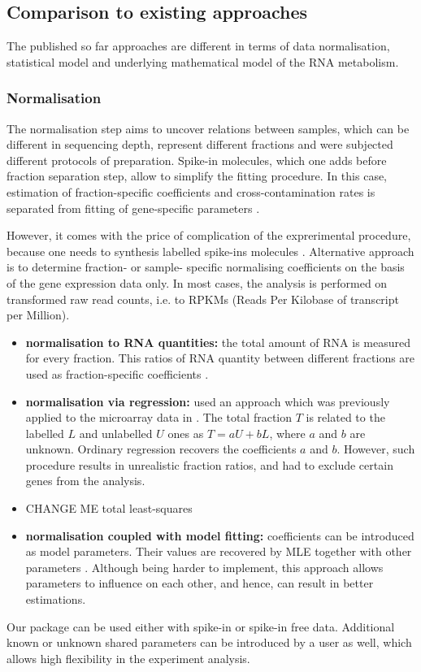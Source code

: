 \subsection{Comparison to existing approaches}
The published so far approaches are different in terms of 
data normalisation, statistical model and underlying mathematical model of the 
RNA metabolism.
\subsubsection*{Normalisation}
The normalisation step aims to uncover relations between samples, which can 
be different in sequencing depth, represent different fractions and were subjected
different protocols of preparation. 
Spike-in molecules, which one adds before fraction separation step,
allow to simplify the fitting procedure. In this case, estimation of fraction-specific 
coefficients and cross-contamination rates is separated from fitting of gene-specific parameters
\citep{schwalb2016tt,neymotin2014determination}.
\par 
However, it comes with the price of complication of the exprerimental procedure,
because one needs to synthesis labelled spike-ins molecules \citep{}.
Alternative approach is to determine fraction- or sample- specific 
normalising coefficients on the basis of the gene expression data only.
 In most cases, the analysis is performed on transformed raw read counts, i.e.
 to RPKMs (Reads Per Kilobase of transcript per Million).
\begin{itemize}
 \item 
\textbf{normalisation to RNA quantities:}  the total amount of 
RNA  is measured for every fraction. This ratios of RNA quantity between 
different fractions are used as fraction-specific coefficients \citep{rabani2011metabolic}.
\item 
\textbf{normalisation via regression:} \citet{schwanhausser2011global} 
used an approach which was previously applied to 
 the microarray data in \citep{dolken2008high}.
 The total fraction $T$ is related to the labelled $L$ and unlabelled $U$ ones as
 $T = aU + bL$, where $a$ and $b$ are unknown.
 Ordinary regression recovers the coefficients $a$ and $b$. However,
 such procedure results in unrealistic fraction ratios, and \citet{schwanhausser2011global}
 had to exclude certain genes from the analysis.
 \item CHANGE ME total least-squares \citep{miller2011dynamic}
 \item \textbf{normalisation coupled with model fitting:}
 coefficients can be introduced as model parameters. Their values are
 recovered by MLE  together with other parameters \citep{eser2016determinants, de2015inspect}.
 Although being harder to implement, this approach allows parameters to influence 
 on each other, and hence, can result in  better estimations.
\end{itemize}
Our package can be used either with spike-in or spike-in free data.
Additional known or unknown shared parameters can be introduced by a user as well, 
which allows high flexibility in the experiment analysis.

